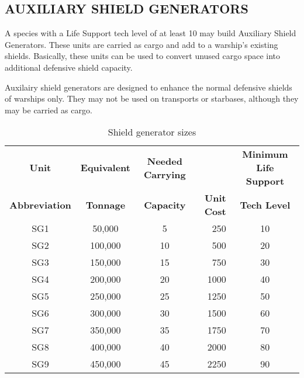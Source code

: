 \documentclass[10pt,titlepage]{article}
\begin{document}
\newpage
\subsection{AUXILIARY SHIELD GENERATORS}

A species with a Life Support tech level of at least 10 may build Auxiliary
Shield Generators.  These units are carried as cargo and add to a warship's
existing shields.  Basically, these units can be used to convert unused cargo
space into additional defensive shield capacity.

Auxilairy shield generators are designed to enhance the normal defensive
shields of warships only.  They may not be used on transports or starbases,
although they may be carried as cargo.

\begin{table}[h]
\begin{center}
\begin{tabular}{|cccrc|}
\hline
  \rowcolor{lightblue} \textbf{Unit}&  \textbf{Equivalent}  & \textbf{Needed Carrying}  &                & \textbf{Minimum Life Support}  \\
\rowcolor{lightblue} \textbf{Abbreviation} &    \textbf{Tonnage}   & \textbf{Capacity} &   \textbf{Unit Cost}&   \textbf{Tech Level}\\
\hline
        SG1     &         50,000    &       5       &      250    &    10 \\
        SG2     &        100,000    &       10      &      500    &    20 \\
        SG3     &        150,000    &       15      &      750    &    30 \\
        SG4     &        200,000    &       20      &      1000   &    40 \\
        SG5     &        250,000    &       25      &      1250   &    50 \\
        SG6     &        300,000    &       30      &      1500   &    60 \\
        SG7     &        350,000    &       35      &      1750   &    70 \\
        SG8     &        400,000    &       40      &      2000   &    80 \\
        SG9     &        450,000    &       45      &      2250   &    90 \\
\hline
\end{tabular}
\caption{Shield generator sizes}
\label{tab:shields}
\end{center}
\end{table}
\end{document}
